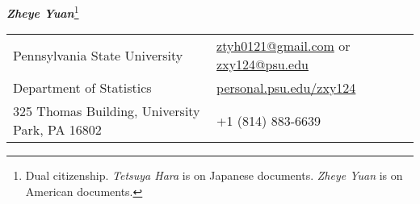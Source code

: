 \documentclass[utf8,letterpaper,oneside]{article}
\begin{document}
\noindent  \textit{\large\textbf{Zheye Yuan}}\footnote[1]{\noindent Dual citizenship. \textit{Tetsuya Hara} is on Japanese documents. \textit{Zheye Yuan} is on American documents.}
\small
\begin{center}
 \begin{tabular}{l l}
  Pennsylvania State University                  & \hspace{1in} \href{mailto:ztyh0121@gmail.com}{ztyh0121@gmail.com} or \href{mailto:zxy124@psu.edu}{zxy124@psu.edu} \\
  Department of Statistics                       & \hspace{1in}   \href{http://personal.psu.edu/zxy124/}{personal.psu.edu/zxy124}                                    \\
  325 Thomas Building, University Park, PA 16802 & \hspace{1in}+1 (814) 883-6639                                                                                     \\
 \end{tabular}
\end{center}
\noindent
\end{document}
